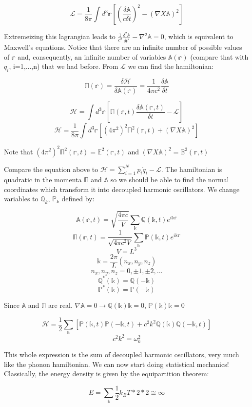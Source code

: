 \documentclass{article}
\newcommand{\pardif}[2]{\frac{\delta#1}{\delta#2}}
\newcommand{\secpardif}[2]{\frac{\delta^{2}#1}{\delta#2^{2}}}
\newcommand{\bltz}{k_{B}}
\newcommand{\sumser}[2]{\sum\limits_{#1}^{#2}}
\newcommand{\mbb}[1]{\mathbb{#1}}
\begin{document}
$$\mathcal{L}=\frac{1}{8\pi}\int d^{3}\mbb{r}[(\frac{\delta\mbb{A}}{c\delta t})^{2}-(\nabla X\mbb{A})^{2}]$$

Extremeizing this lagrangian leads to $\frac{1}{c^{2}}\secpardif{\mbb{A}}{t}-\nabla^{2}\mbb{A}=0$, which is equivalent to Maxwell's equations.  Notice that there are an infinite number of possible values of $\mbb{r}$ and, consequently, an infinite number of variables $\mbb{A}(\mbb{r})$ (compare that with $q_{i}$, i=1,...,n) that we had before.  From $\mathcal{L}$ we can find the hamiltonian:

$$\mbb{\Pi}(\mbb{r})=\pardif{\mathcal{H}}{\mbb{A}(\mbb{r})}=\frac{1}{4\pi c^{2}}\pardif{\mbb{A}}{t}$$

$$\mathcal{H}=\int d^{3}\mbb{r}[\mbb{\Pi}(\mbb{r},t)\pardif{\mbb{A}(\mbb{r},t)}{t}-\mathcal{L}]$$
$$\mathcal{H}=\frac{1}{8\pi}\int d^{3}\mbb{r}[(4\pi^{2})^{2}\mbb{\Pi}^{2}(\mbb{r},t)+(\nabla X\mbb{A})^{2}]$$

Note that $(4\pi^{2})^{2}\mbb{\Pi}^{2}(\mbb{r},t)=\mbb{E}^{2}(\mbb{r},t)$ and $(\nabla X\mbb{A})^{2}=\mbb{B}^{2}(\mbb{r},t)$

Compare the equation above to $\mathcal{H}=\sumser{i=1}{N}p_{i}\dot{q}_{i}-\mathcal{L}$.  The hamiltonian is quadratic in the momenta $\mbb{\Pi}$ and $\mbb{A}$ so we should be able to find the normal coordinates which transform it into decoupled harmonic oscillators.  We change variables to $\mbb{Q}_{k}$, $\mbb{P}_{k}$ defined by:

$$\mbb{A}(\mbb{r},t)=\sqrt{\frac{4\pi c}{V}}\sum_{\mbb{k}}\mbb{Q}(\mbb{k},t)e^{i\mbb{k}\mbb{r}}$$
$$\mbb{\Pi}(\mbb{r},t)=\frac{1}{\sqrt{4\pi c^{2}V}}\sum_{\mbb{k}}\mbb{P}(\mbb{k},t)e^{i\mbb{k}\mbb{r}}$$
$$V=L^{3}$$
$$\mbb{k}=\frac{2\pi}{L}(n_{x},n_{y},n_{z})$$
$$n_{x},n_{y},n_{z}=0,\pm1,\pm2,...$$
$$\mbb{Q}^{*}(\mbb{k})=\mbb{Q}(-\mbb{k})$$
$$\mbb{P}^{*}(\mbb{k})=\mbb{P}(-\mbb{k})$$

Since $\mbb{A}$ and $\mbb{\Pi}$ are real.  $\nabla\mbb{A}=0\rightarrow\mbb{Q}(\mbb{k})\mbb{k}=0$, $\mbb{P}(\mbb{k})\mbb{k}=0$

$$\mathcal{H}=\frac{1}{2}\sum_{\mbb{k}}[\mbb{P}(\mbb{k},t)\mbb{P}(-\mbb{k},t)+c^{2}k^{2}\mbb{Q}(\mbb{k})\mbb{Q}(-\mbb{k},t)]$$
$$c^{2}k^{2}=\omega_{k}^{2}$$

This whole expression is the sum of decoupled harmonic oscillators, very much like the phonon hamiltonian.  We can now start doing statistical mechanics!  Classically, the energy density is given by the equipartition theorem:

$$E=\sum_{\mbb{k}}\frac{1}{2}\bltz T*2*2\cong\infty$$
\end{document}
